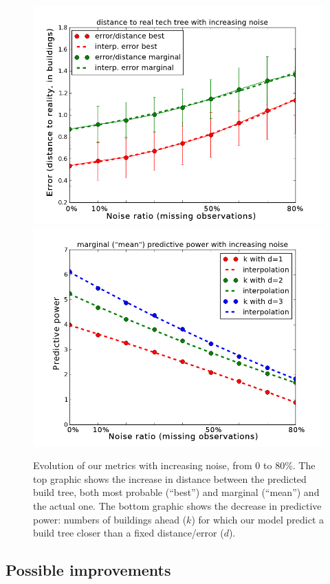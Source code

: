 \begin{figure}[htp]
\begin{center}
\includegraphics[width=0.7\columnwidth]{images/error_noise2.png}\\
\includegraphics[width=0.7\columnwidth]{images/predictive_power_noise2.png}
\end{center}
\caption{Evolution of our metrics with increasing noise, from 0 to 80\%. The top graphic shows the increase in distance between the predicted build tree, both most probable (``best'') and marginal (``mean'') and the actual one. The bottom graphic shows the decrease in predictive power: numbers of buildings ahead ($k$) for which our model predict a build tree closer than a fixed distance/error ($d$).}
\label{fig:buildtreenoise}
\end{figure}

\subsection{Possible improvements}
\label{sec:buildtreeimprovements}

